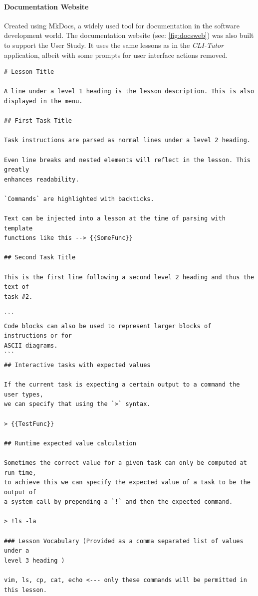 \paragraph{Documentation Website} Created using MkDocs,\cite{mkdocs} a widely
used tool for documentation in the software development world. The
documentation website (see: \autoref{fig:docsweb}) was also built to support the
User Study. It uses the same lessons as in the \textit{CLI-Tutor}
application, albeit with some prompts for user interface actions removed.
\begin{lstlisting}[float=htbp, frame=single, language={}, label=lst:markdown, caption=Specification for Markdown lesson files.]
# Lesson Title

A line under a level 1 heading is the lesson description. This is also
displayed in the menu.

## First Task Title

Task instructions are parsed as normal lines under a level 2 heading.

Even line breaks and nested elements will reflect in the lesson. This greatly
enhances readability.

`Commands` are highlighted with backticks.

Text can be injected into a lesson at the time of parsing with template
functions like this --> {{SomeFunc}}

## Second Task Title

This is the first line following a second level 2 heading and thus the text of
task #2.

```
Code blocks can also be used to represent larger blocks of instructions or for
ASCII diagrams.
```
## Interactive tasks with expected values

If the current task is expecting a certain output to a command the user types,
we can specify that using the `>` syntax.

> {{TestFunc}}

## Runtime expected value calculation

Sometimes the correct value for a given task can only be computed at run time,
to achieve this we can specify the expected value of a task to be the output of
a system call by prepending a `!` and then the expected command.

> !ls -la

### Lesson Vocabulary (Provided as a comma separated list of values under a
level 3 heading )

vim, ls, cp, cat, echo <--- only these commands will be permitted in this lesson.

\end{lstlisting}

